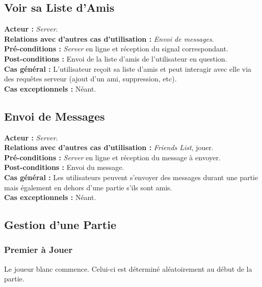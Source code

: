 \documentclass[10pt, a4paper]{article}
\begin{document}
\subsection{Voir sa Liste d'Amis}
\textbf{Acteur :} \textit{Server}. \\
\textbf{Relations avec d'autres cas d'utilisation :} {\itshape Envoi de messages}. \\
\textbf{Pré-conditions :} \textit{Server} en ligne et réception du signal correspondant. \\
\textbf{Post-conditions :} Envoi de la liste d'amis de l'utilisateur en question. \\
\textbf{Cas général :} L'utilisateur reçoit sa liste d'amis et peut interagir avec elle via des requêtes serveur (ajout d'un ami, suppression, etc).\\
\textbf{Cas exceptionnels :} Néant. \\

\subsection{Envoi de Messages}
\textbf{Acteur :} \textit{Server}. \\
\textbf{Relations avec d'autres cas d'utilisation :} \textit{Friends List}, jouer. \\
\textbf{Pré-conditions :} \textit{Server} en ligne et réception du message à envoyer. \\
\textbf{Post-conditions :} Envoi du message. \\
\textbf{Cas général :} Les utilisateurs peuvent s'envoyer des messages durant une partie mais également en dehors d'une partie s'ils sont amis. \\
\textbf{Cas exceptionnels :} Néant. \\

\subsection{Gestion d'une Partie}

\subsubsection{Premier à Jouer}
Le joueur blanc commence. Celui-ci est déterminé aléatoirement au début de la partie. \\
\end{document}
